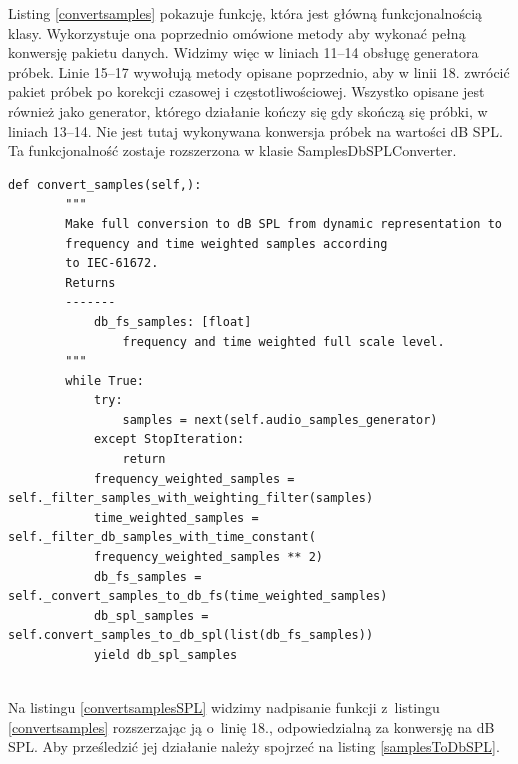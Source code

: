\documentclass[eng,printmode]{mgr}
\begin{document}
Listing \ref{convertsamples} pokazuje funkcję, która jest główną funkcjonalnością klasy. Wykorzystuje ona poprzednio omówione metody aby wykonać pełną konwersję pakietu danych. Widzimy więc w liniach 11--14 obsługę generatora próbek. Linie 15--17 wywołują metody opisane poprzednio, aby w linii 18. zwrócić pakiet próbek po korekcji czasowej i częstotliwościowej. Wszystko opisane jest również jako generator, którego działanie kończy się gdy skończą się próbki, w liniach 13--14. Nie jest tutaj wykonywana konwersja próbek na wartości dB SPL. Ta funkcjonalność zostaje rozszerzona w klasie SamplesDbSPLConverter.

\begin{minipage}{\linewidth}
\begin{lstlisting}[caption={fragment kodu źródłowego pliku SampleSPLConverter.py,\newline klasa SamplesDbSPLConverter, metoda convert\_samples},captionpos=b,label={convertsamplesSPL}]
    def convert_samples(self,):
        """
        Make full conversion to dB SPL from dynamic representation to
        frequency and time weighted samples according
        to IEC-61672.
        Returns
        -------
            db_fs_samples: [float]
                frequency and time weighted full scale level.
        """
        while True:
            try:
                samples = next(self.audio_samples_generator)
            except StopIteration:
                return
            frequency_weighted_samples = self._filter_samples_with_weighting_filter(samples)
            time_weighted_samples = self._filter_db_samples_with_time_constant(
            frequency_weighted_samples ** 2)
            db_fs_samples = self._convert_samples_to_db_fs(time_weighted_samples)
            db_spl_samples = self.convert_samples_to_db_spl(list(db_fs_samples))
            yield db_spl_samples
 
\end{lstlisting}
\end{minipage}


Na listingu \ref{convertsamplesSPL} widzimy nadpisanie funkcji z~listingu \ref{convertsamples} rozszerzając ją o~linię 18., odpowiedzialną za konwersję na dB SPL. Aby prześledzić jej działanie należy spojrzeć na listing \ref{samplesToDbSPL}.
\end{document}
